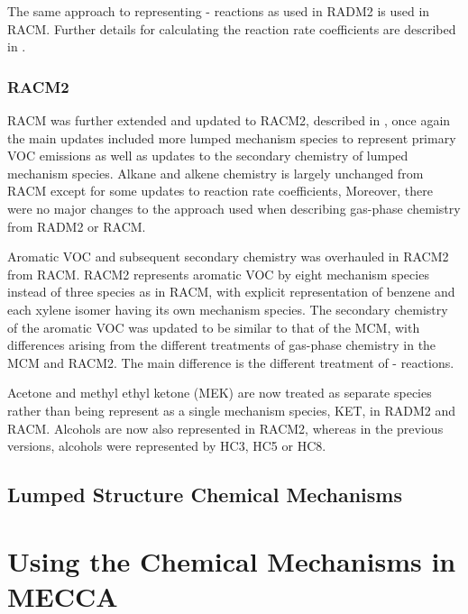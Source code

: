The same approach to representing - reactions as used in RADM2 is used in RACM. 
Further details for calculating the reaction rate coefficients are described in \citet{Kirchner:1996}.

\subsubsection{RACM2}
RACM was further extended and updated to RACM2, described in \citet{Goliff:2013}, once again the main updates included more lumped mechanism species to represent primary VOC emissions as well as updates to the secondary chemistry of lumped mechanism species.
Alkane and alkene chemistry is largely unchanged from RACM except for some updates to reaction rate coefficients,
Moreover, there were no major changes to the approach used when describing gas-phase chemistry from RADM2 or RACM.

Aromatic VOC and subsequent secondary chemistry was overhauled in RACM2 from RACM.
RACM2 represents aromatic VOC by eight mechanism species instead of three species as in RACM, with explicit representation of benzene and each xylene isomer having its own mechanism species.
The secondary chemistry of the aromatic VOC was updated to be similar to that of the MCM, with differences arising from the different treatments of gas-phase chemistry in the MCM and RACM2.
The main difference is the different treatment of - reactions.

Acetone and methyl ethyl ketone (MEK) are now treated as separate species rather than being represent as a single mechanism species, KET, in RADM2 and RACM.
Alcohols are now also represented in RACM2, whereas in the previous versions, alcohols were represented by HC3, HC5 or HC8.


\subsection{Lumped Structure Chemical Mechanisms} \label{ss:lumped_structure}

\section{Using the Chemical Mechanisms in MECCA}
